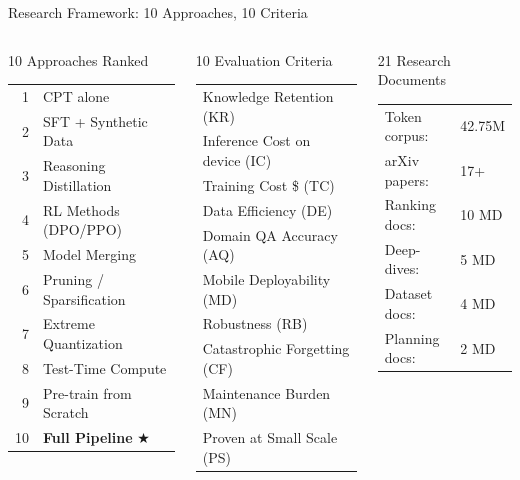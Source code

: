\documentclass[aspectratio=169,11pt]{beamer}
\begin{document}
\begin{frame}{Research Framework: 10 Approaches, 10 Criteria}
\begin{columns}[T]
\begin{block}{10 Approaches Ranked}
  \scriptsize
  \begin{tabular}{@{}rl@{}}
    1  & CPT alone\\
    2  & SFT + Synthetic Data\\
    3  & Reasoning Distillation\\
    4  & RL Methods (DPO/PPO)\\
    5  & Model Merging\\
    6  & Pruning / Sparsification\\
    7  & Extreme Quantization\\
    8  & Test-Time Compute\\
    9  & Pre-train from Scratch\\
    10 & \textbf{Full Pipeline} $\bigstar$\\
  \end{tabular}
\end{block}

\begin{block}{10 Evaluation Criteria}
  \scriptsize
  \begin{tabular}{@{}l@{}}
    Knowledge Retention (KR)\\
    Inference Cost on device (IC)\\
    Training Cost \$ (TC)\\
    Data Efficiency (DE)\\
    Domain QA Accuracy (AQ)\\
    Mobile Deployability (MD)\\
    Robustness (RB)\\
    Catastrophic Forgetting (CF)\\
    Maintenance Burden (MN)\\
    Proven at Small Scale (PS)\\
  \end{tabular}
\end{block}

\begin{block}{21 Research Documents}
  \scriptsize
  \begin{tabular}{@{}ll@{}}
    Token corpus: & 42.75M\\
    arXiv papers: & 17+\\
    Ranking docs: & 10 MD\\
    Deep-dives: & 5 MD\\
    Dataset docs: & 4 MD\\
    Planning docs: & 2 MD\\
  \end{tabular}
\end{block}


\end{columns}
\end{frame}
\end{document}
